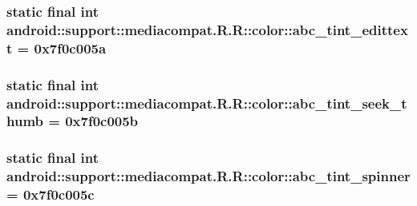 \hypertarget{classandroid_1_1support_1_1mediacompat_1_1_r_1_1color_6e8dbbbab03a0ec484afae42574f80d8}{
\subsubsection[{abc\_\-tint\_\-edittext}]{\setlength{\rightskip}{0pt plus 5cm}static final int android::support::mediacompat.R.R::color::abc\_\-tint\_\-edittext = 0x7f0c005a}}
\label{classandroid_1_1support_1_1mediacompat_1_1_r_1_1color_6e8dbbbab03a0ec484afae42574f80d8}


\hypertarget{classandroid_1_1support_1_1mediacompat_1_1_r_1_1color_561b8759c12ac2fd9c8094ca5cac9f3e}{
\subsubsection[{abc\_\-tint\_\-seek\_\-thumb}]{\setlength{\rightskip}{0pt plus 5cm}static final int android::support::mediacompat.R.R::color::abc\_\-tint\_\-seek\_\-thumb = 0x7f0c005b}}
\label{classandroid_1_1support_1_1mediacompat_1_1_r_1_1color_561b8759c12ac2fd9c8094ca5cac9f3e}


\hypertarget{classandroid_1_1support_1_1mediacompat_1_1_r_1_1color_0e975309b6f01d73009092bea3fc1ad5}{
\subsubsection[{abc\_\-tint\_\-spinner}]{\setlength{\rightskip}{0pt plus 5cm}static final int android::support::mediacompat.R.R::color::abc\_\-tint\_\-spinner = 0x7f0c005c}}
\label{classandroid_1_1support_1_1mediacompat_1_1_r_1_1color_0e975309b6f01d73009092bea3fc1ad5}


